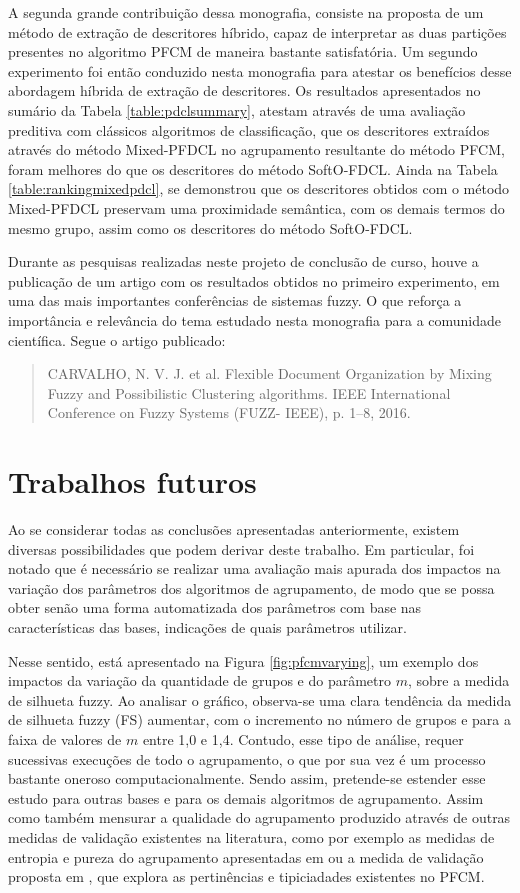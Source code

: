 A segunda grande contribuição dessa monografia, consiste na proposta de um método de extração de
descritores híbrido, capaz de interpretar as duas partições presentes no algoritmo PFCM de maneira
bastante satisfatória. Um segundo experimento foi então conduzido nesta monografia para atestar os
benefícios desse abordagem híbrida de extração de descritores. Os resultados apresentados no sumário
da Tabela \ref{table:pdclsummary}, atestam através de uma avaliação preditiva com clássicos
algoritmos de classificação, que os descritores extraídos através do método Mixed-PFDCL no
agrupamento resultante do método PFCM, foram melhores do que os descritores do método SoftO-FDCL.
Ainda na Tabela \ref{table:rankingmixedpdcl}, se demonstrou que os descritores obtidos com o método
Mixed-PFDCL preservam uma proximidade semântica, com os demais termos do mesmo grupo, assim como os
descritores do método SoftO-FDCL.

Durante as pesquisas realizadas neste projeto de conclusão de curso, houve a publicação de um artigo
com os resultados obtidos no primeiro experimento, em uma das mais importantes conferências de
sistemas fuzzy. O que reforça a importância e relevância do tema estudado nesta monografia para a
comunidade científica. Segue o artigo publicado:
\begin{quote}
CARVALHO, N. V. J. et al. Flexible Document Organization by Mixing Fuzzy and Possibilistic
Clustering algorithms. IEEE International Conference on Fuzzy Systems (FUZZ- IEEE), p. 1–8, 2016.
\end{quote}

\section{Trabalhos futuros}

Ao se considerar todas as conclusões apresentadas anteriormente, existem diversas possibilidades que
podem derivar deste trabalho. Em particular, foi notado que é necessário se realizar uma avaliação
mais apurada dos impactos na variação dos parâmetros dos algoritmos de agrupamento, de modo que se
possa obter senão uma forma automatizada dos parâmetros com base nas características das bases,
indicações de quais parâmetros utilizar. 

Nesse sentido, está apresentado na Figura \ref{fig:pfcmvarying}, um exemplo dos impactos da variação
da quantidade de grupos e do parâmetro $m$, sobre a medida de silhueta fuzzy. Ao analisar o gráfico,
observa-se uma clara tendência da medida de silhueta fuzzy (FS) aumentar, com o incremento no número
de grupos e para a faixa de valores de $m$ entre 1,0 e 1,4. Contudo, esse tipo de análise, requer
sucessivas execuções de todo o agrupamento, o que por sua vez é um processo bastante oneroso
computacionalmente. Sendo assim, pretende-se estender esse estudo para outras bases e para os
demais algoritmos de agrupamento. Assim como também mensurar a qualidade do agrupamento produzido
através de outras medidas de validação existentes na literatura, como por exemplo as medidas de
entropia e pureza do agrupamento apresentadas em  ou a medida de validação
proposta em , que explora as pertinências e tipiciadades existentes no
PFCM.

